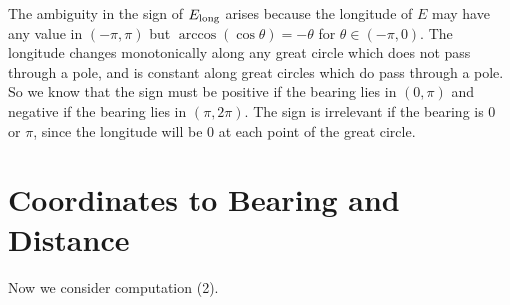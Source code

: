 \documentclass[12pt]{article}
\renewcommand\long[1]{{#1}_{\rm long}}
\begin{document}
The ambiguity in the sign of $\long E$ arises because the longitude of
$E$ may have any value in $(-\pi, \pi)$ but
$\arccos(\cos\theta) = -\theta$ for $\theta\in(-\pi,0)$.  The
longitude changes monotonically along any great circle which does not
pass through a pole, and is constant along great circles which do pass
through a pole.  So we know that the sign must be positive if the
bearing lies in $(0, \pi)$ and negative if the bearing lies in
$(\pi, 2\pi)$.  The sign is irrelevant if the bearing is $0$ or $\pi$,
since the longitude will be $0$ at each point of the great circle.

\section{Coordinates to Bearing and Distance}
Now we consider computation (2).
\end{document}
